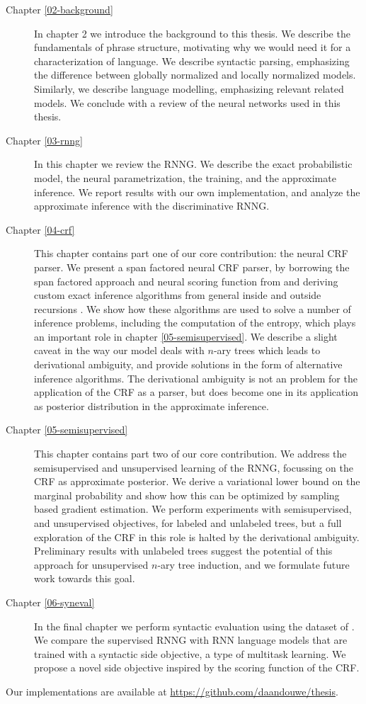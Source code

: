 \begin{description}
  \item[Chapter \ref{02-background}]
    In chapter 2 we introduce the background to this thesis. We describe the fundamentals of phrase structure, motivating why we would need it for a characterization of language. We describe syntactic parsing, emphasizing the difference between globally normalized and locally normalized models. Similarly, we describe language modelling, emphasizing relevant related models. We conclude with a review of the neural networks used in this thesis.

  \item[Chapter \ref{03-rnng}]
    In this chapter we review the RNNG. We describe the exact probabilistic model, the neural parametrization, the training, and the approximate inference. We report results with our own implementation, and analyze the approximate inference with the discriminative RNNG.

  \item[Chapter \ref{04-crf}]
    This chapter contains part one of our core contribution: the neural CRF parser. We present a span factored neural CRF parser, by borrowing the span factored approach and neural scoring function from \citet{stern2017minimal} and deriving custom exact inference algorithms from general inside and outside recursions \citep{goodman1999semiring}. We show how these algorithms are used to solve a number of inference problems, including the computation of the entropy, which plays an important role in chapter \ref{05-semisupervised}. We describe a slight caveat in the way our model deals with $n$-ary trees which leads to derivational ambiguity, and provide solutions in the form of alternative inference algorithms. The derivational ambiguity is not an problem for the application of the CRF as a parser, but does become one in its application as posterior distribution in the approximate inference.

  \item[Chapter \ref{05-semisupervised}]
    This chapter contains part two of our core contribution. We address the semisupervised and unsupervised learning of the RNNG, focussing on the CRF as approximate posterior. We derive a variational lower bound on the marginal probability and show how this can be optimized by sampling based gradient estimation. We perform experiments with semisupervised, and unsupervised objectives, for labeled and unlabeled trees, but a full exploration of the CRF in this role is halted by the derivational ambiguity. Preliminary results with unlabeled trees suggest the potential of this approach for unsupervised $n$-ary tree induction, and we formulate future work towards this goal.


  \item[Chapter \ref{06-syneval}]
    In the final chapter we perform syntactic evaluation using the dataset of \citet{linzen2018targeted}. We compare the supervised RNNG with RNN language models that are trained with a syntactic side objective, a type of multitask learning. We propose a novel side objective inspired by the scoring function of the CRF.

\end{description}


Our implementations are available at \url{https://github.com/daandouwe/thesis}.

